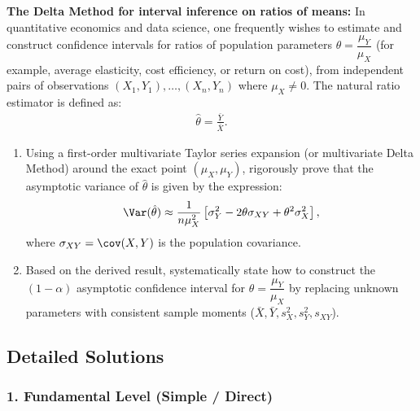 \begin{problema}
	\label{prob:ic-desaf-delta-method}
	\textbf{The Delta Method for interval inference on ratios of means:}
	In quantitative economics and data science, one frequently wishes to estimate and construct confidence intervals for ratios of population parameters $\theta = \dfrac{\mu_Y}{\mu_X}$ (for example, average elasticity, cost efficiency, or return on cost), from independent pairs of observations $(X_1, Y_1), \dots, (X_n, Y_n)$ where $\mu_X \neq 0$. The natural ratio estimator is defined as:
	\begin{align}
		\hat{\theta} = \frac{\bar{Y}}{\bar{X}}.
	\end{align}
	\begin{enumerate}
		\item Using a first-order multivariate Taylor series expansion (or multivariate Delta Method) around the exact point $(\mu_X, \mu_Y)$, rigorously prove that the asymptotic variance of $\hat{\theta}$ is given by the expression:
		\begin{align}
			\Var(\hat{\theta}) \approx \frac{1}{n \mu_X^2} \left[ \sigma_Y^2 - 2\theta \sigma_{XY} + \theta^2 \sigma_X^2 \right],
		\end{align}
		where $\sigma_{XY} = \cov(X, Y)$ is the population covariance.
		\item Based on the derived result, systematically state how to construct the $(1-\alpha)$ asymptotic confidence interval for $\theta = \dfrac{\mu_Y}{\mu_X}$ by replacing unknown parameters with consistent sample moments ($\bar{X}, \bar{Y}, s_X^2, s_Y^2, s_{XY}$).
	\end{enumerate}
\end{problema}


\subsection{Detailed Solutions}

\subsubsection*{1. Fundamental Level (Simple / Direct)}

